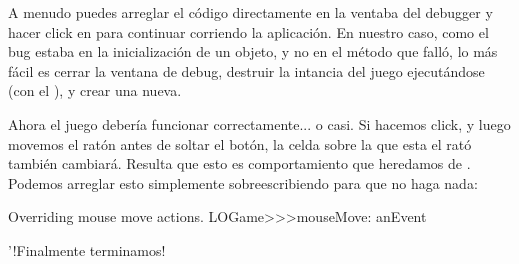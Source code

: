 \documentclass[a4paper,10pt,twoside]{book}
\begin{document}
{%
A menudo puedes arreglar el c\'odigo directamente en la ventaba del debugger y hacer click en  para continuar corriendo la aplicaci\'on.
En nuestro caso, como el bug estaba en la inicializaci\'on de un objeto, y no en el m\'etodo que fall\'o, lo m\'as f\'acil
es cerrar la ventana de debug, destruir la intancia del juego ejecut\'andose (con el ), y crear una nueva.



Ahora el juego deber\'ia funcionar correctamente... o casi. Si hacemos click, y luego movemos el rat\'on antes de soltar el bot\'on, la celda sobre la que esta el rat\'o tambi\'en cambiar\'a. Resulta que esto es comportamiento que heredamos de . Podemos arreglar esto simplemente sobreescribiendo  para que no haga nada:

\begin{method}[mouseMove:]{Overriding mouse move actions.}
LOGame>>>mouseMove: anEvent
\end{method}

'!Finalmente terminamos!


}
\end{document}
